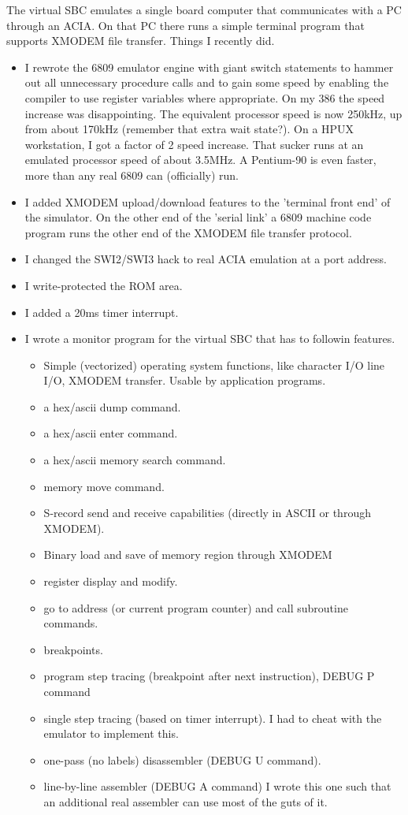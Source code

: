 The virtual SBC emulates a single board computer that communicates with a PC
through an ACIA. On that PC there runs a simple terminal program that
supports XMODEM file transfer. Things I recently did.

\begin{itemize}
\item I rewrote the 6809 emulator engine with giant switch statements to hammer
  out all unnecessary procedure calls and to gain some speed by enabling the 
  compiler to use register variables where appropriate. On my 386 the
  speed increase was disappointing. The equivalent processor speed is now
  250kHz, up from about 170kHz (remember that extra wait state?). On a HPUX
  workstation, I got a factor of 2 speed increase. That sucker runs at an
  emulated processor speed of about 3.5MHz. A Pentium-90 is even faster,
  more than any real 6809 can (officially) run.
\item I added XMODEM upload/download features to the 'terminal front end' of the
  simulator. On the other end of the 'serial link' a 6809 machine code
  program runs the other end of the XMODEM file transfer protocol. 
\item I changed the SWI2/SWI3 hack to real ACIA emulation at a port address.
\item I write-protected the ROM area.
\item I added a 20ms timer interrupt. 
\item I wrote a monitor program for the virtual SBC that has to followin
  features.
  \begin{itemize}
  \item Simple (vectorized) operating system functions, like character I/O
    line I/O, XMODEM transfer. Usable by application programs.
  \item a hex/ascii dump command.
  \item a hex/ascii enter command.
  \item a hex/ascii memory search command.
  \item memory move command.
  \item S-record send and receive capabilities (directly in ASCII or
    through XMODEM).
  \item Binary load and save of memory region through XMODEM
  \item register display and modify.
  \item go to address (or current program counter) and call subroutine commands.
  \item breakpoints.
  \item program step tracing (breakpoint after next instruction), DEBUG P
    command
  \item single step tracing (based on timer interrupt). I had to cheat with the
    emulator to implement this. 
  \item one-pass (no labels) disassembler (DEBUG U command).
  \item line-by-line assembler (DEBUG A command) I wrote
    this one such that an additional real assembler can use most of the guts of
    it.
  \end{itemize}
\end{itemize}


